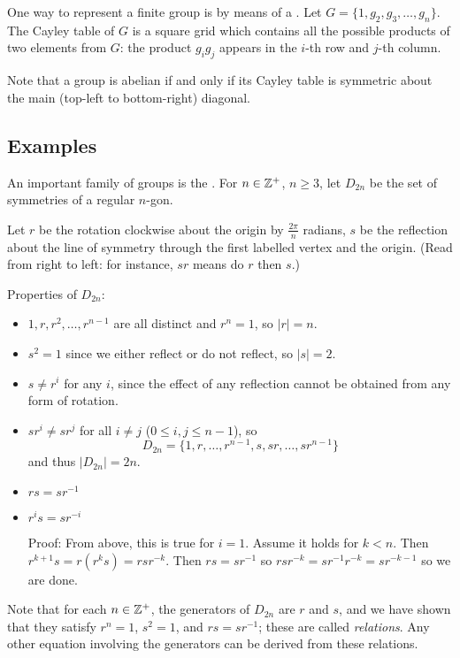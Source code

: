 One way to represent a finite group is by means of a . Let $G=\{1,g_2,g_3,\dots,g_n\}$. The Cayley table of $G$ is a square grid which contains all the possible products of two elements from $G$: the product $g_ig_j$ appears in the $i$-th row and $j$-th column.

\begin{remark}
Note that a group is abelian if and only if its Cayley table is symmetric about the main (top-left to bottom-right) diagonal.
\end{remark}

\subsection{Examples}
\begin{example}
An important family of groups is the . For $n\in\mathbb Z^+$, $n\ge3$, let $D_{2n}$ be the set of symmetries of a regular $n$-gon.

Let $r$ be the rotation clockwise about the origin by $\frac{2\pi}{n}$ radians, $s$ be the reflection about the line of symmetry through the first labelled vertex and the origin. (Read from right to left: for instance, $sr$ means do $r$ then $s$.)

Properties of $D_{2n}$:
\begin{itemize}
\item $1,r,r^2,\dots,r^{n-1}$ are all distinct and $r^n=1$, so $|r|=n$.
\item $s^2=1$ since we either reflect or do not reflect, so $|s|=2$.
\item $s\neq r^i$ for any $i$, since the effect of any reflection cannot be obtained from any form of rotation.
\item $sr^i\neq sr^j$ for all $i\neq j$ ($0\le i,j\le n-1$), so
\[D_{2n}=\{1,r,\dots,r^{n-1},s,sr,\dots,sr^{n-1}\}\]
and thus $|D_{2n}|=2n$.
\item $rs=sr^{-1}$
\item $r^is=sr^{-i}$

Proof: From above, this is true for $i=1$. Assume it holds for $k<n$. Then $r^{k+1}s=r(r^ks)=rsr^{-k}$. Then $rs=sr^{-1}$ so $rsr^{-k}=sr^{-1}r^{-k}=sr^{-k-1}$ so we are done.
\end{itemize}
\end{example}

Note that for each $n\in\mathbb Z^+$, the generators of $D_{2n}$ are $r$ and $s$, and we have shown that they satisfy $r^n=1$, $s^2=1$, and $rs=sr^{-1}$; these are called \emph{relations}. Any other equation involving the generators can be derived from these relations.

